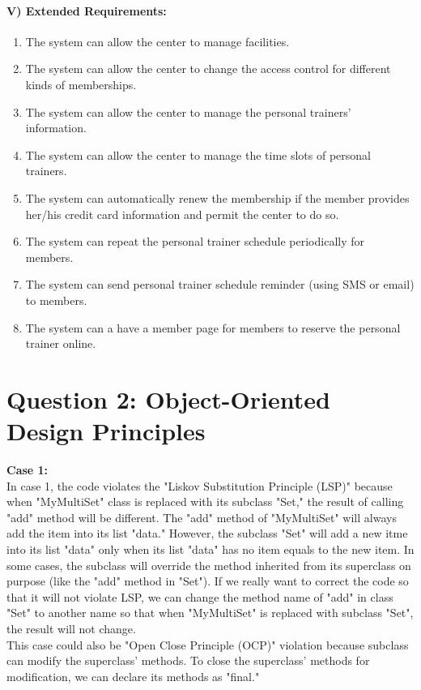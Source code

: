 \documentclass[11pt]{article}
\begin{document}
\paragraph{V) Extended Requirements:\\}
\begin{enumerate}
\item The system can allow the center to manage facilities.
\item The system can allow the center to change the access control for different kinds of memberships.
\item The system can allow the center to manage the personal trainers' information.
\item The system can allow the center to manage the time slots of personal trainers.
\item The system can automatically renew the membership if the member provides her/his credit card information and permit the center to do so. 
\item The system can repeat the personal trainer schedule periodically for members.
\item The system can send personal trainer schedule reminder (using SMS or email) to members.
\item The system can a have a member page for members to reserve the personal trainer online.

\end{enumerate}
\newpage
\section{Question 2: Object-Oriented Design Principles}
\textbf{Case 1:}\\
In case 1, the code violates the "Liskov Substitution Principle (LSP)" because when "MyMultiSet" class is replaced with its subclass "Set," the result of calling "add" method will be different. The "add" method of "MyMultiSet" will always add the item into its list "data." However, the subclass "Set" will add a new itme into its list "data" only when its list "data" has no item equals to the new item. In some cases, the subclass will override the method inherited from its superclass on purpose (like the "add" method in "Set"). If we really want to correct the code so that it will not violate LSP, we can change the method name of "add" in class "Set" to another name so that when "MyMultiSet" is replaced with subclass "Set", the result will not change.\\
This case could also be "Open Close Principle (OCP)" violation because subclass can modify the superclass' methods. To close the superclass' methods for modification, we can declare its methods as "final."\\
\end{document}
